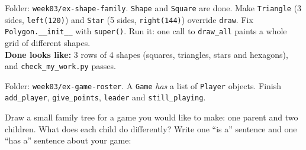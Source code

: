 \begin{exercise}
Folder: \texttt{week03/ex-shape-family}. \texttt{Shape} and \texttt{Square} are done. Make \texttt{Triangle} (3 sides, \texttt{left(120)}) and \texttt{Star} (5 sides, \texttt{right(144)}) override \texttt{draw}. Fix \texttt{Polygon.\_\_init\_\_} with \texttt{super()}. Run it: one call to \texttt{draw\_all} paints a whole grid of different shapes.\\
\textbf{Done looks like:} 3 rows of 4 shapes (squares, triangles, stars and hexagons), and \texttt{check\_my\_work.py} passes.
\end{exercise}

\begin{exercise}
Folder: \texttt{week03/ex-game-roster}. A \texttt{Game} \emph{has} a list of \texttt{Player} objects. Finish \texttt{add\_player}, \texttt{give\_points}, \texttt{leader} and \texttt{still\_playing}.
\end{exercise}

\begin{vocab}
\end{vocab}

\begin{reflection}
Draw a small family tree for a game you would like to make: one parent and two children. What does each child do differently?
\answerspace{3cm}
Write one \enquote{is a} sentence and one \enquote{has a} sentence about your game:
\end{reflection}
